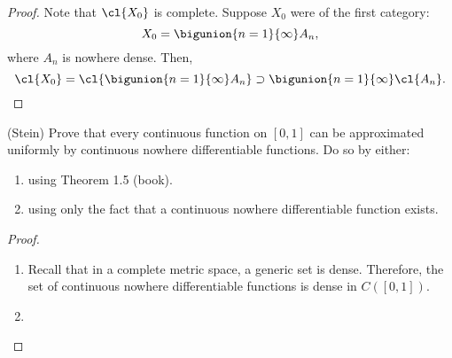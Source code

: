 \begin{problemset}
\begin{proof}
    Note that $\cl{X_0}$ is complete. Suppose $X_0$ were of the first category:
    $$X_0 = \bigunion{n=1}{\infty}A_n,$$
    where $A_n$ is nowhere dense. Then,
    $$\cl{X_0} = \cl{\bigunion{n=1}{\infty}A_n} \supset \bigunion{n=1}{\infty}\cl{A_n}.$$
\end{proof}
\item (Stein) Prove that every continuous function on $[0,1]$ can be approximated uniformly by continuous nowhere differentiable functions. Do so by either:
\begin{enumerate}
    \item using Theorem 1.5 (book). 
    \item using only the fact that a continuous nowhere differentiable function exists. 
\end{enumerate}
\begin{proof}
\begin{enumerate}
    \item Recall that in a complete metric space, a generic set is dense. Therefore, the set of continuous nowhere differentiable functions is dense in $C([0,1])$. 
    \item 
\end{enumerate}
\end{proof}


\end{problemset}
